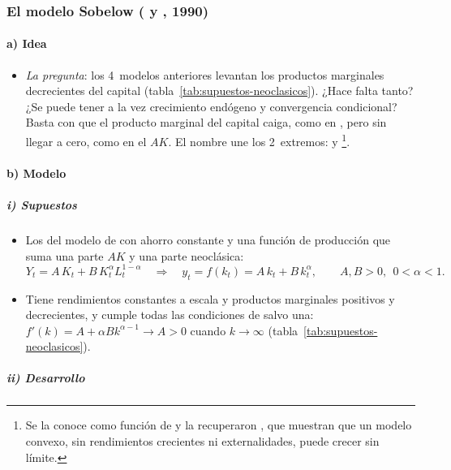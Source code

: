 \documentclass[11pt]{article}
\begin{document}
\subsubsection{El modelo Sobelow ( y , 1990)}\label{sec:sobelow}

\paragraph{a) Idea}

\begin{itemize}
\item \emph{La pregunta}: los 4~modelos anteriores levantan los productos marginales decrecientes del capital (tabla~\ref{tab:supuestos-neoclasicos}). ¿Hace falta tanto? ¿Se puede tener a la vez crecimiento endógeno y convergencia condicional? Basta con que el producto marginal del capital caiga, como en , pero sin llegar a cero, como en el $AK$. El nombre une los 2~extremos:  y \footnote{Se la conoce como función de \textcite{Kurz1968}\nocite{SaintPaul1992} y la recuperaron \textcite{JonesManuelli1990}, que muestran que un modelo convexo, sin rendimientos crecientes ni externalidades, puede crecer sin límite.}.
\end{itemize}

\paragraph{b) Modelo}

\subparagraph{i) Supuestos}

\begin{itemize}
\item Los del modelo de  con ahorro constante y una función de producción que suma una parte $AK$ y una parte neoclásica:
  \[Y_t=A\,K_t+B\,K_t^{\alpha}L_t^{1-\alpha}\quad\Longrightarrow\quad y_t=f(k_t)=A\,k_t+B\,k_t^{\alpha},\qquad A,B>0,\ \ 0<\alpha<1.\]
\item Tiene rendimientos constantes a escala y productos marginales positivos y decrecientes, y cumple todas las condiciones de  salvo una: $f'(k)=A+\alpha Bk^{\alpha-1}\to A>0$ cuando $k\to\infty$ (tabla~\ref{tab:supuestos-neoclasicos}).
\end{itemize}

\subparagraph{ii) Desarrollo}
\end{document}
